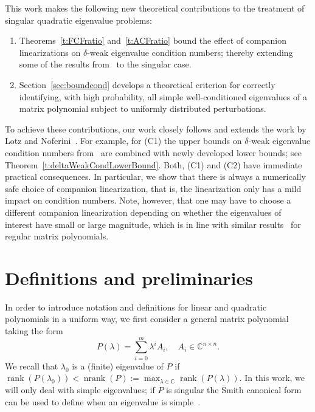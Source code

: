 \documentclass[12pt]{article}
\DeclareMathOperator{\nrank}{nrank}
\DeclareMathOperator{\rank}{rank}
\DeclareMathOperator{\rev}{rev}
\begin{document}
This work makes the following new theoretical contributions to the treatment of singular quadratic eigenvalue problems:
\begin{enumerate}
\item[(C1)] Theorems~\ref{t:FCFratio} and~\ref{t:ACFratio} bound the effect of companion linearizations on $\delta$-weak eigenvalue condition numbers; thereby extending some of the results from~\cite{higham2006conditioning} to the singular case.
\item[(C2)] Section~\ref{sec:boundcond} develops a theoretical criterion for correctly identifying, with high probability, all simple well-conditioned eigenvalues of a matrix polynomial subject to uniformly distributed perturbations.
 \end{enumerate}
To achieve these contributions, our work closely follows and extends the work by Lotz and Noferini~\cite{lotz2020wilkinson}. For example, for (C1) the upper bounds on $\delta$-weak eigenvalue condition numbers from~\cite{lotz2020wilkinson} are combined with newly developed lower bounds; see Theorem~\ref{t:deltaWeakCondLowerBound}. Both, (C1) and (C2) have immediate practical consequences. In particular, we show that there is always a numerically safe choice of companion linearization, that is, the linearization only has a mild impact on condition numbers. Note, however, that one may have to choose a different companion linearization depending on whether the eigenvalues of interest have small or large magnitude, which is in line with similar results~\cite{higham2006conditioning,adhikari2011structured} for regular matrix polynomials.

\section{Definitions and preliminaries}

In order to introduce notation and definitions for linear and quadratic polynomials in a uniform way, we first consider a general matrix polynomial taking the form
\begin{equation} \label{eq:genpoly} P(\lambda) = \sum^m_{i=0}\lambda^iA_i,\quad A_i\in\mathbb{C}^{n\times n}.
\end{equation}
  We recall that $\lambda_0$ is a (finite) eigenvalue of $P$ if
$
    \rank(P(\lambda_0)) < \nrank (P) := \max_{\lambda \in\mathbb{C}}\rank(P(\lambda)).
$
In this work, we will only deal with simple eigenvalues; if $P$ is singular the Smith canonical form can be used to define when an eigenvalue is simple~\cite{de2010first}.
\end{document}
